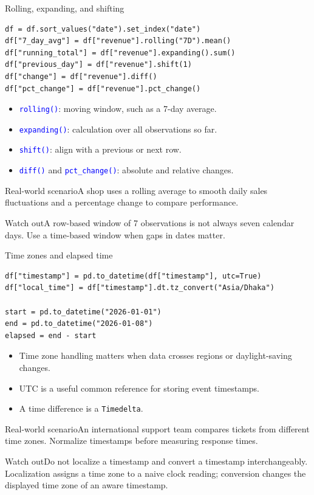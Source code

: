 \documentclass[aspectratio=169,10pt]{beamer}
\newcommand{\scenario}[1]{\begin{block}{Real-world scenario}#1\end{block}}
\newcommand{\pitfall}[1]{\begin{alertblock}{Watch out}#1\end{alertblock}}
\newcommand{\method}[1]{\texttt{\textcolor{Blue}{#1}}}
\begin{document}
\begin{frame}[fragile]{Rolling, expanding, and shifting}
\begin{lstlisting}
df = df.sort_values("date").set_index("date")
df["7_day_avg"] = df["revenue"].rolling("7D").mean()
df["running_total"] = df["revenue"].expanding().sum()
df["previous_day"] = df["revenue"].shift(1)
df["change"] = df["revenue"].diff()
df["pct_change"] = df["revenue"].pct_change()
\end{lstlisting}
\begin{itemize}
\item \method{rolling()}: moving window, such as a 7-day average.
\item \method{expanding()}: calculation over all observations so far.
\item \method{shift()}: align with a previous or next row.
\item \method{diff()} and \method{pct\_change()}: absolute and relative changes.
\end{itemize}
\scenario{A shop uses a rolling average to smooth daily sales fluctuations and a percentage change to compare performance.}
\pitfall{A row-based window of 7 observations is not always seven calendar days. Use a time-based window when gaps in dates matter.}
\end{frame}

\begin{frame}[fragile]{Time zones and elapsed time}
\begin{lstlisting}
df["timestamp"] = pd.to_datetime(df["timestamp"], utc=True)
df["local_time"] = df["timestamp"].dt.tz_convert("Asia/Dhaka")

start = pd.to_datetime("2026-01-01")
end = pd.to_datetime("2026-01-08")
elapsed = end - start
\end{lstlisting}
\begin{itemize}
\item Time zone handling matters when data crosses regions or daylight-saving changes.
\item UTC is a useful common reference for storing event timestamps.
\item A time difference is a \texttt{Timedelta}.
\end{itemize}
\scenario{An international support team compares tickets from different time zones. Normalize timestamps before measuring response times.}
\pitfall{Do not localize a timestamp and convert a timestamp interchangeably. Localization assigns a time zone to a naive clock reading; conversion changes the displayed time zone of an aware timestamp.}
\end{frame}
\end{document}
